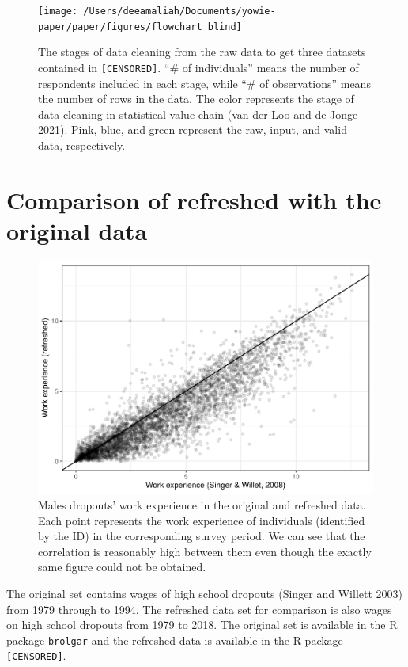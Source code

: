 \documentclass{article}
\begin{document}
\begin{figure}

{\centering \texttt{[image: /Users/deeamaliah/Documents/yowie-paper/paper/figures/flowchart\_blind]} 

}

\caption{The stages of data cleaning from the raw data to get three datasets contained in \texttt{[CENSORED]}. ``\# of individuals'' means the number of respondents included in each stage, while ``\# of observations'' means the number of rows in the data. The color represents the stage of data cleaning in statistical value chain (van der Loo and de Jonge 2021). Pink, blue, and green represent the raw, input, and valid data, respectively.}\label{fig:flow-chart-blind}
\end{figure}

\hypertarget{compare}{%
\section{Comparison of refreshed with the original data}\label{compare}}

\begin{figure}

{\centering \includegraphics[width=0.7\linewidth]{figures/compare-xp-sw-1} 

}

\caption{Males dropouts' work experience in the original and refreshed data. Each point represents the work experience of individuals (identified by the ID) in the corresponding survey period. We can see that the correlation is reasonably high between them even though the exactly same figure could not be obtained.}\label{fig:compare-xp-sw}
\end{figure}

The original set contains wages of high school dropouts (Singer and Willett 2003) from 1979 through to 1994. The refreshed data set for comparison is also wages on high school dropouts from 1979 to 2018. The original set is available in the R package \texttt{brolgar} and the refreshed data is available in the R package \texttt{[CENSORED]}.
\end{document}
